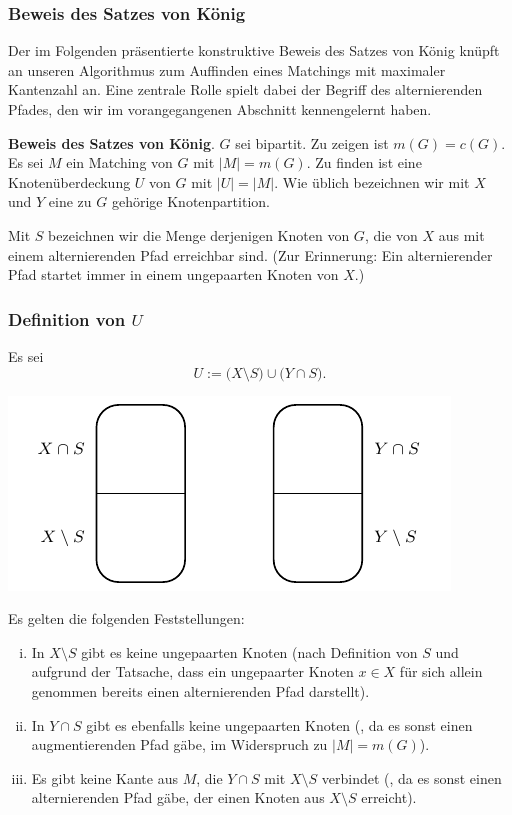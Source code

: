 \documentclass[smaller]{beamer}
\begin{document}
\begin{frame}
 \frametitle{Beweis des Satzes von König}
 Der im Folgenden präsentierte konstruktive Beweis des Satzes von König knüpft an unseren Algorithmus zum Auffinden eines Matchings mit maximaler Kantenzahl an. Eine zentrale Rolle spielt dabei der Begriff des \alert{alternierenden Pfades}, den wir im vorangegangenen Abschnitt kennengelernt haben. \\ \vspace*{0.2cm}

\textbf{Beweis des Satzes von König}. $G$ sei bipartit. Zu zeigen ist $m(G) = c(G)$. Es sei $M$ ein Matching von $G$ mit $|M|=m(G)$. Zu finden ist eine Knotenüberdeckung $U$ von $G$ mit $|U|=|M|$. Wie üblich bezeichnen wir mit $X$ und $Y$ eine zu $G$ gehörige Knotenpartition. \\ \vspace*{0.2cm}

Mit $S$\label{page:11:7} bezeichnen wir die Menge derjenigen Knoten von $G$, die von $X$ aus mit einem alternierenden Pfad erreichbar sind. (Zur Erinnerung: Ein alternierender Pfad startet immer in einem ungepaarten Knoten von $X$.) 
\end{frame}

\begin{frame}
 \frametitle{Definition von $U$}
 Es sei
\[
U := \big( X \setminus S \big) \cup \big( Y \cap S \big).
\]

\begin{center}
\includegraphics[scale=0.8]{fig46.pdf}
\end{center}

Es gelten die folgenden Feststellungen:
\begin{enumerate}[i)]
\item In $X \setminus S$ gibt es keine ungepaarten Knoten (nach Definition von $S$ und aufgrund der Tatsache, dass ein ungepaarter Knoten $x \in X$ für sich allein genommen bereits einen alternierenden Pfad darstellt).
\item In $Y \cap S$ gibt es ebenfalls keine ungepaarten Knoten (, da es sonst einen augmentierenden Pfad gäbe, im Widerspruch zu $|M|=m(G)$).
\item Es gibt keine Kante aus $M$, die $Y \cap S$ mit $X \setminus S$ verbindet (, da es sonst einen alternierenden Pfad gäbe, der einen Knoten aus $X \setminus S$ erreicht).
\end{enumerate}

\end{frame}
\end{document}
